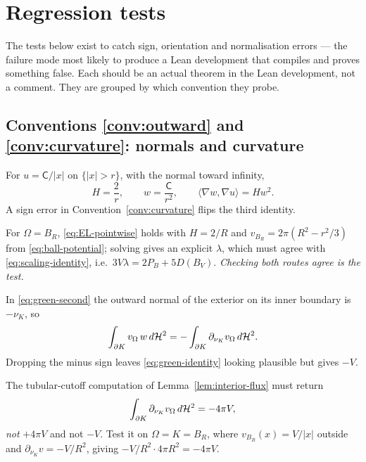 \chapter{Regression tests}\label{ch:tests}

The tests below exist to catch sign, orientation and normalisation errors ---
the failure mode most likely to produce a Lean development that compiles and
proves something false.  Each should be an actual theorem in the Lean
development, not a comment.  They are grouped by which convention they probe.

\section{Conventions \ref{conv:outward} and \ref{conv:curvature}: normals and curvature}

\begin{test}\label{test:model-potential}
For $u=\mathsf C/|x|$ on $\{|x|>r\}$, with the normal toward infinity,
\[
  H=\frac2r,
  \qquad
  w=\frac{\mathsf C}{r^2},
  \qquad
  \langle\nabla w,\nabla u\rangle=Hw^2 .
\]
A sign error in Convention~\ref{conv:curvature} flips the third identity.
\end{test}

\begin{test}\label{test:ball-stationary}
For $\Omega=B_R$, \eqref{eq:EL-pointwise} holds with
$H=2/R$ and $v_{B_R}=2\pi(R^2-r^2/3)$ from
\eqref{eq:ball-potential}; solving gives an explicit $\lambda$, which must
agree with \eqref{eq:scaling-identity}, i.e.\
$3V\lambda=2P_B+5D(B_V)$.  \emph{Checking both routes agree is the test.}
\end{test}

\begin{test}\label{test:green-normal}
In \eqref{eq:green-second} the outward normal of the exterior on its inner
boundary is $-\nu_K$, so
\[
  \int_{\partial K}v_\Omega\,w\,d\mathcal H^2
  =-\int_{\partial K}\partial_{\nu_K}v_\Omega\,d\mathcal H^2 .
\]
Dropping the minus sign leaves \eqref{eq:green-identity} looking plausible but
gives $-V$.
\end{test}

\begin{test}\label{test:tubular-flux}
The tubular-cutoff computation of Lemma~\ref{lem:interior-flux} must return
\[
  \int_{\partial K}\partial_{\nu_K}v_\Omega\,d\mathcal H^2=-4\pi V ,
\]
\emph{not} $+4\pi V$ and not $-V$.  Test it on $\Omega=K=B_R$, where
$v_{B_R}(x)=V/|x|$ outside and $\partial_{\nu_K}v=-V/R^2$, giving
$-V/R^2\cdot4\pi R^2=-4\pi V$.
\end{test}

